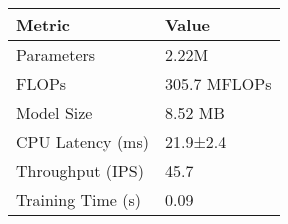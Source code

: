\begin{tabular}{ll}
\toprule
Metric & Value \\
\midrule
Parameters & 2.22M \\
FLOPs & 305.7 MFLOPs \\
Model Size & 8.52 MB \\
CPU Latency (ms) & 21.9±2.4 \\
Throughput (IPS) & 45.7 \\
Training Time (s) & 0.09 \\
\bottomrule
\end{tabular}



